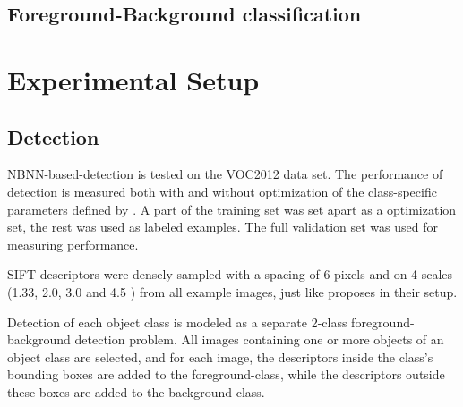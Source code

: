 \documentclass[a4paper,10pt]{article}
\begin{document}


\subsection{Foreground-Background classification} %
\label{sec:foreground_background_classification}


\section{Experimental Setup} %
\label{sec:experimental_setup}



\subsection{Detection} %
\label{sub:detection}
NBNN-based-detection is tested on the VOC2012  data set. The performance of detection is measured both with and without optimization of the class-\-specific pa\-ra\-me\-ters defined by \cite{behmo2010towards}. A part of the training set was set apart as a optimization set, the rest was used as labeled examples. The full validation set was used for measuring performance.

SIFT descriptors were densely sampled with a spacing of 6 pixels and on 4 scales (1.33, 2.0, 3.0 and 4.5 ) from all example images, just like \cite{mccann2011local} proposes in their setup. 


Detection of each object class is modeled as a separate 2-class foreground-background detection problem. All images containing one or more objects of an object class are selected, and for each image, the descriptors inside the class's bounding boxes are added to the foreground-class, while the descriptors outside these boxes are added to the background-class.
\end{document}
